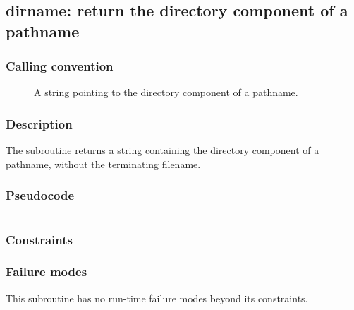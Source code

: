 \clearpage
{}
{}
\label{subr:dirname}
\subsection*{dirname: return the directory component of a pathname}

\subsubsection*{Calling convention}

\begin{description}
\item[] A string pointing to the directory component of
  a pathname.
\end{description}

\subsubsection*{Description}

The  subroutine returns a string containing the
directory component of a pathname, without the terminating filename.
\subsubsection*{Pseudocode}

\begin{verbatim}
\end{verbatim}

\subsubsection*{Constraints}

\subsubsection*{Failure modes}

This subroutine has no run-time failure modes beyond its constraints.
